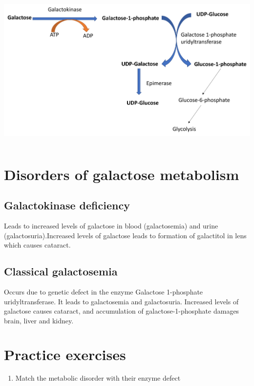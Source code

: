 \documentclass[
]{book}
\providecommand{\tightlist}{%
  \setlength{\itemsep}{0pt}\setlength{\parskip}{0pt}}
\begin{document}
\includegraphics[width=\textwidth,height=3.125in]{Images/Galactose.png}

\section{Disorders of galactose metabolism}\label{disorders-of-galactose-metabolism}

\subsection{Galactokinase deficiency}\label{galactokinase-deficiency}

Leads to increased levels of galactose in blood (galactosemia) and urine (galactosuria).Increased levels of galactose leads to formation of galactitol in lens which causes cataract.

\subsection{Classical galactosemia}\label{classical-galactosemia}

Occurs due to genetic defect in the enzyme Galactose 1-phosphate uridyltransferase. It leads to galactosemia and galactosuria. Increased levels of galactose causes cataract, and accumulation of galactose-1-phosphate damages brain, liver and kidney.

\section{Practice exercises}\label{practice-exercises-7}

\begin{enumerate}
\def\labelenumi{\arabic{enumi}.}
\tightlist
\item
  Match the metabolic disorder with their enzyme defect
\end{enumerate}
\end{document}
